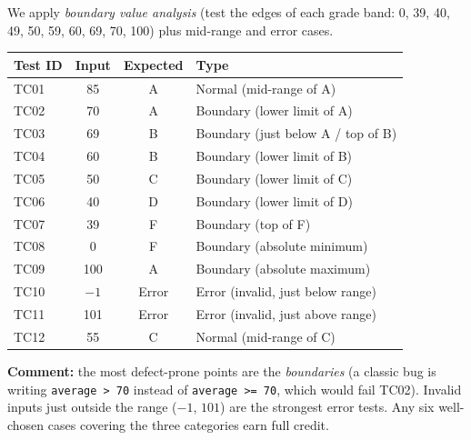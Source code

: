 \documentclass[11pt]{article}
\begin{document}
\begin{corrige}
We apply \emph{boundary value analysis} (test the edges of each grade band: 0, 39, 40, 49, 50, 59, 60, 69, 70, 100) plus mid-range and error cases.

\begin{center}
\begin{tabularx}{\linewidth}{|l|c|c|X|}\hline
\rowcolor{popblueL} \textbf{Test ID} & \textbf{Input} & \textbf{Expected} & \textbf{Type} \\ \hline
TC01 & 85 & A & Normal (mid-range of A) \\ \hline
TC02 & 70 & A & Boundary (lower limit of A) \\ \hline
TC03 & 69 & B & Boundary (just below A / top of B) \\ \hline
TC04 & 60 & B & Boundary (lower limit of B) \\ \hline
TC05 & 50 & C & Boundary (lower limit of C) \\ \hline
TC06 & 40 & D & Boundary (lower limit of D) \\ \hline
TC07 & 39 & F & Boundary (top of F) \\ \hline
TC08 & 0 & F & Boundary (absolute minimum) \\ \hline
TC09 & 100 & A & Boundary (absolute maximum) \\ \hline
TC10 & $-1$ & Error & Error (invalid, just below range) \\ \hline
TC11 & 101 & Error & Error (invalid, just above range) \\ \hline
TC12 & 55 & C & Normal (mid-range of C) \\ \hline
\end{tabularx}
\end{center}

\textbf{Comment:} the most defect-prone points are the \emph{boundaries} (a classic bug is writing \texttt{average > 70} instead of \texttt{average >= 70}, which would fail TC02). Invalid inputs just outside the range ($-1$, $101$) are the strongest error tests. Any six well-chosen cases covering the three categories earn full credit.
\end{corrige}
\end{document}
